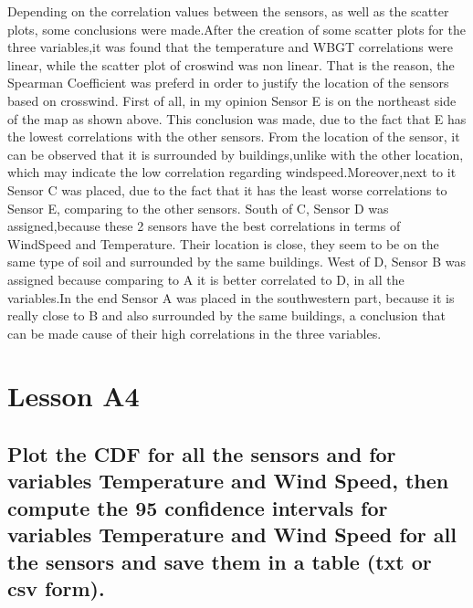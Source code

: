 \documentclass[a4paper,12pt]{article} %
\begin{document}
Depending on the correlation values between the sensors, as well as the scatter plots, some conclusions were made.After the creation of some scatter plots for the three variables,it was found that the temperature and WBGT correlations were linear, while the scatter plot of croswind was non linear. That is the reason, the Spearman Coefficient was preferd in order to justify the location of the sensors based on crosswind. First of all, in my opinion Sensor E is on the northeast side of the map as shown above. This conclusion was made, due to the fact that E has the lowest correlations with the other sensors. From the location of the sensor, it can be observed that it is surrounded by buildings,unlike with the other location, which may indicate the low correlation regarding windspeed.Moreover,next to it Sensor C was placed, due to the fact that it has the least worse correlations to Sensor E, comparing to the other sensors. South of C, Sensor D was assigned,because these 2 sensors have the best correlations in terms of WindSpeed and Temperature. Their location is close, they seem to be on the same type of soil and surrounded by the same buildings. West of D, Sensor B was assigned because comparing to A it is better correlated to D, in all the variables.In the end Sensor A was placed in the southwestern part, because it is really close to B and also surrounded by the same buildings, a conclusion that can be made cause of their high correlations in the three variables.

\section { Lesson A4}

\subsection{Plot the CDF for all the sensors and for variables Temperature and Wind Speed, then compute the 95 confidence intervals for variables Temperature and Wind Speed for all the sensors and save them in a table (txt or csv form).}
\end{document}
